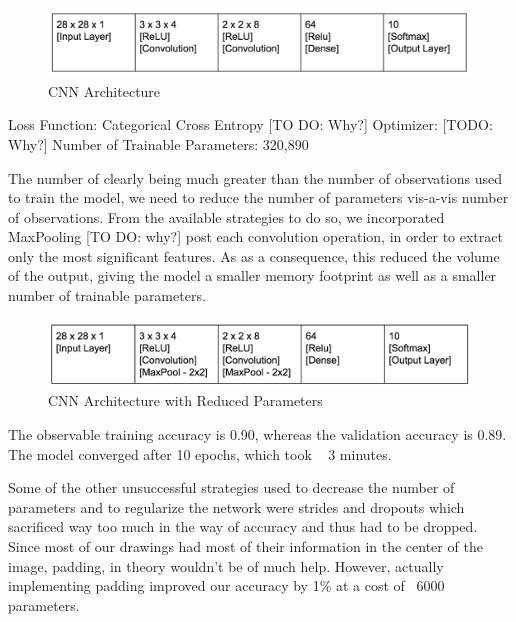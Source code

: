 \documentclass[12pt]{article}
\begin{document}
\begin{figure}
  \begin{center}
    \includegraphics[scale=0.5]{fig3}
    \end{center}
  \caption{CNN Architecture}
  \label{fig:cnnArch}
\end{figure}

Loss Function: Categorical Cross Entropy [TO DO: Why?]
Optimizer: [TODO: Why?]
Number of Trainable Parameters: 320,890


The number of clearly being much greater than the number of observations used
to train the model, we need to reduce the number of parameters vis-a-vis
number of observations. From the available strategies to do so, we
incorporated MaxPooling [TO DO: why?] post each convolution operation, in
order to extract only the most significant features. As as a consequence,
this reduced the volume of the output, giving the model a smaller memory
footprint as well as a smaller number of trainable parameters.

\begin{figure}
  \begin{center}
    \includegraphics[scale=0.5]{fig4}
  \end{center}
  \caption{CNN Architecture with Reduced Parameters}
  \label{fig:cnnArchPool}
\end{figure}

The observable training accuracy is 0.90, whereas the validation accuracy is
0.89. The model converged after 10 epochs, which took ~ 3 minutes.

Some of the other unsuccessful strategies used to decrease the number of
parameters and to regularize the network were strides and dropouts which
sacrificed way too much in the way of accuracy and thus had to be dropped.
Since most of our drawings had most of their information in the center of the
image, padding, in theory wouldn’t be of much help. However, actually
implementing padding improved our accuracy by 1\% at a cost of ~6000
parameters.
\end{document}
